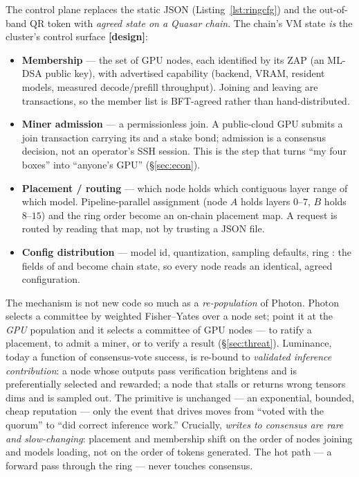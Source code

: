 \documentclass[11pt]{article}
\newcommand{\design}{\textcolor{cmt}{\small\textbf{[design]}}}
\begin{document}
The control plane replaces the static  JSON (Listing~\ref{lst:ringcfg}) and
the out-of-band QR token with \emph{agreed state on a Quasar chain}. The chain's VM state
\emph{is} the cluster's control surface \design{}:
\begin{itemize}[leftmargin=1.4em,itemsep=2pt]
\item \textbf{Membership} --- the set of GPU nodes, each identified by its ZAP 
(an ML-DSA public key), with advertised capability (backend, VRAM, resident models, measured
decode/prefill throughput). Joining and leaving are transactions, so the member list is
BFT-agreed rather than hand-distributed.
\item \textbf{Miner admission} --- a permissionless join. A public-cloud GPU submits a join
transaction carrying its  and a stake bond; admission is a consensus decision, not
an operator's SSH session. This is the step that turns ``my four boxes'' into ``anyone's GPU''
(\S\ref{sec:econ}).
\item \textbf{Placement / routing} --- which node holds which contiguous layer range of which
model. Pipeline-parallel assignment (node $A$ holds layers $0$--$7$, $B$ holds $8$--$15$) and
the ring order become an on-chain placement map. A request is routed by reading that map, not by
trusting a JSON file.
\item \textbf{Config distribution} --- model id, quantization, sampling defaults, ring
: the fields of  and  become chain state, so
every node reads an identical, agreed configuration.
\end{itemize}

The mechanism is not new code so much as a \emph{re-population} of Photon. Photon selects a
committee by weighted Fisher--Yates over a node set; point it at the \emph{GPU} population and it
selects a committee of GPU nodes --- to ratify a placement, to admit a miner, or to verify a
result (\S\ref{sec:threat}). Luminance, today a function of consensus-vote success, is re-bound
to \emph{validated inference contribution}: a node whose outputs pass verification brightens and
is preferentially selected and rewarded; a node that stalls or returns wrong tensors dims and is
sampled out. The primitive is unchanged --- an exponential, bounded, cheap reputation --- only
the event that drives  moves from ``voted with the quorum'' to
``did correct inference work.'' Crucially, \emph{writes to consensus are rare and
slow-changing}: placement and membership shift on the order of nodes joining and models loading,
not on the order of tokens generated. The hot path --- a forward pass through the ring --- never
touches consensus.
\end{document}
